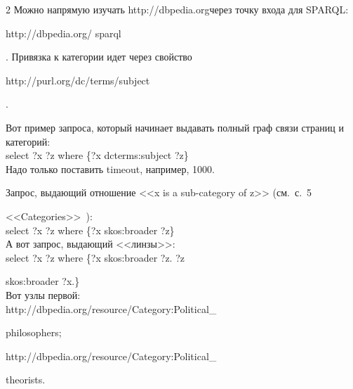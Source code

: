 \begin{multicols}{2}
   Можно напрямую изучать {\sf http://dbpedia.org}\linebreak через точку входа для SPARQL: 

      {\sf 

http://dbpedia.org/ sparql}. Привязка к категории идет через свойство {\sf 

http://purl.org/dc/terms/subject}.

   

   Вот пример запроса, который начинает выдавать полный граф связи страниц и категорий:\\[-8pt]

   

   

{\sf select ?x ?z where \{?x dcterms:subject ?z\}}\\[-8pt]

   

   Надо только поставить timeout, например, 1000.

   

   Запрос, выдающий отношение <<{\sf x} is a sub-category of {\sf z}>> (см.\ с.~5 

<<Categories>>~\cite{5-shk}):\\[-8pt]



{\sf select ?x ?z where \{?x skos:broader ?z\}}\\[-8pt]

   

   А вот запрос, выдающий <<линзы>>:\\[-8pt]



{\sf select ?x ?z where \{?x skos:broader ?z. ?z }



{\sf skos:broader ?x.\}}\\[-8pt]

   

   Вот узлы первой:\\[-8pt] 



{\sf http://dbpedia.org/resource/Category:Political\_}



{\sf philosophers;}





   

{\sf http://dbpedia.org/resource/Category:Political\_}



{\sf theorists.}\\[-8pt]


\end{multicols}
